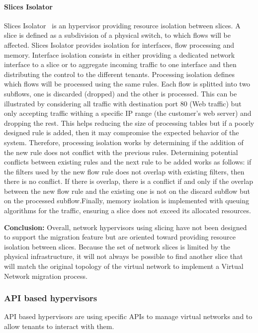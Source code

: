 \paragraph{Slices Isolator}
Slices Isolator~\cite{SlicesIsolator-El-Azzab2011} is an hypervisor providing resource isolation between slices. A slice is defined as a subdivision of a physical switch, to which flows will be affected. Slices Isolator provides isolation for interfaces, flow processing and memory. Interface isolation consists in either providing a dedicated network interface to a slice or to aggregate incoming traffic to one interface and then distributing the control to the different tenants. Processing isolation defines which flows will be processed using the same rules. Each flow is splitted into two subflows, one is discarded (dropped) and the other is processed. This can be illustrated by considering all traffic with destination port 80 (Web traffic) but only accepting traffic withing a specific IP range (the customer's web server) and dropping the rest. This helps reducing the size of processing tables but if a poorly designed rule is added, then it may compromise the expected behavior of the system. Therefore, processing isolation works by determining if the addition of the new rule does not conflict with the previous rules. Determining potential conflicts between existing rules and the next rule to be added works as follows: if the filters used by the new flow rule does not overlap with existing filters, then there is no conflict.
If there is overlap, there is a conflict if and only if the overlap between the new flow rule and the existing one is not on the discard subflow but on the processed subflow.Finally, memory isolation is implemented with queuing algorithms for the traffic, ensuring a slice does not exceed its allocated resources. 

\textbf{Conclusion:} Overall, network hypervisors using slicing have not been designed to support the migration feature but are oriented toward providing resource isolation between slices. Because the set of network slices is limited by the physical infrastructure, it will not always be possible to find another slice that will match the original topology of the virtual network to implement a Virtual Network migration process.

\subsubsection{API based hypervisors}
API based hypervisors are using specific APIs to manage virtual networks and to allow tenants to interact with them.

